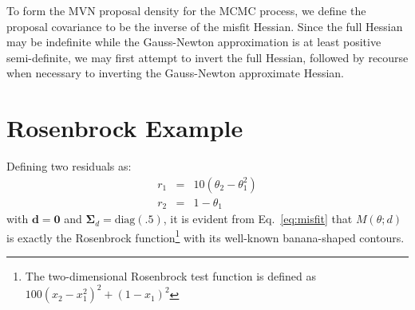 To form the MVN proposal density for the MCMC process, we define the
proposal covariance to be the inverse of the misfit Hessian.  Since
the full Hessian may be indefinite while the Gauss-Newton
approximation is at least positive semi-definite, we may first attempt
to invert the full Hessian, followed by recourse when necessary to
inverting the Gauss-Newton approximate Hessian.

\section{Rosenbrock Example} \label{uq:bayes:ex}

Defining two residuals as:
\begin{eqnarray}
r_1 &=& 10 (\theta_2 - \theta_1^2) \label{eq:rosen_r1} \\
r_2 &=& 1 - \theta_1 \label{eq:rosen_r2}
\end{eqnarray}
with $\boldsymbol{d} = \boldsymbol{0}$ and $\boldsymbol{\Sigma}_d =
\text{diag}(\boldsymbol{.5})$, it is evident from Eq.~\ref{eq:misfit}
that $M(\theta;d)$ is exactly the Rosenbrock function\footnote{The
  two-dimensional Rosenbrock test function is defined as $100 (x_2 -
  x_1^2)^2 + (1 - x_1)^2$} with its well-known banana-shaped contours.

